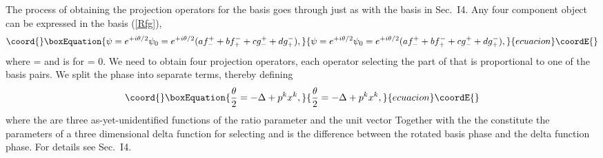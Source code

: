 \documentclass[a4paper,12pt]{article}
\begin{document}
	The process of obtaining the projection operators for the \coordHE{} basis goes through just as with the \coordHE{} basis in Sec.~I4. Any four component object \myHighlight{$\psi$}\coordHE{} can be expressed in the \coordHE{} basis (\ref{Rfg}),
\begin{equation}\coord{}\boxEquation{	\label{psi0}
\psi = e^{+i\theta/2} \psi_{0} = e^{+i\theta/2}(a f_{-}^{+} + b f_{+}^{-} + c g_{-}^{+} + d g_{+}^{-}), 
}{	\psi = e^{+i\theta/2} \psi_{0} = e^{+i\theta/2}(a f_{-}^{+} + b f_{+}^{-} + c g_{-}^{+} + d g_{+}^{-}), 
}{ecuacion}\coordE{}\end{equation}
where \coordHE{} = \coordHE{} and \coordHE{} is \myHighlight{$\psi$}\coordHE{} for \myHighlight{$\theta$}\coordHE{} = 0. We need to obtain four projection operators, each operator selecting the part of \myHighlight{$\psi$}\coordHE{} that is proportional to one of the basis pairs. We split the phase into separate terms, thereby defining \myHighlight{$\Delta,$}\coordHE{}
\begin{equation}\coord{}\boxEquation{	\label{psi,theta}
\frac{\theta}{2} = - \Delta + p^{k} x^{k},
}{	\frac{\theta}{2} = - \Delta + p^{k} x^{k},
}{ecuacion}\coordE{}\end{equation}
where the \coordHE{} are three as-yet-unidentified functions of the ratio parameter \coordHE{} and the unit vector \coordHE{} Together with the \coordHE{} the \coordHE{} constitute the parameters of a three dimensional delta function for selecting \coordHE{} and \coordHE{}  \myHighlight{$\Delta$}\coordHE{} is the difference between the rotated basis phase \coordHE{} and the delta function phase. For details see Sec.~I4.
\end{document}
